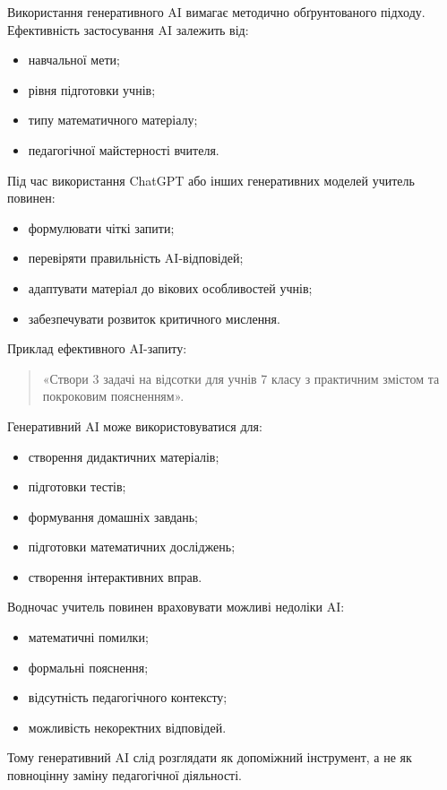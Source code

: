 Використання генеративного AI вимагає методично обґрунтованого підходу. Ефективність застосування AI залежить від:
\begin{itemize}
\item навчальної мети;
\item рівня підготовки учнів;
\item типу математичного матеріалу;
\item педагогічної майстерності вчителя.
\end{itemize}

Під час використання ChatGPT або інших генеративних моделей учитель повинен:
\begin{itemize}
\item формулювати чіткі запити;
\item перевіряти правильність AI-відповідей;
\item адаптувати матеріал до вікових особливостей учнів;
\item забезпечувати розвиток критичного мислення.
\end{itemize}

Приклад ефективного AI-запиту:
\begin{quote}
«Створи 3 задачі на відсотки для учнів 7 класу з практичним змістом та покроковим поясненням».
\end{quote}

Генеративний AI може використовуватися для:
\begin{itemize}
\item створення дидактичних матеріалів;
\item підготовки тестів;
\item формування домашніх завдань;
\item підготовки математичних досліджень;
\item створення інтерактивних вправ.
\end{itemize}

Водночас учитель повинен враховувати можливі недоліки AI:
\begin{itemize}
\item математичні помилки;
\item формальні пояснення;
\item відсутність педагогічного контексту;
\item можливість некоректних відповідей.
\end{itemize}

Тому генеративний AI слід розглядати як допоміжний інструмент, а не як повноцінну заміну педагогічної діяльності.

